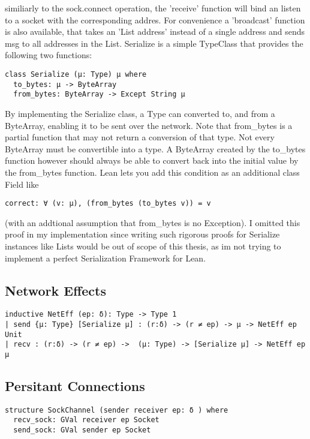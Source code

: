 similiarly to the sock.connect operation, the 'receive' function will bind an listen to a socket with the corresponding addres. For convenience a 'broadcast' function is also available, that takes an 'List address' instead of a single address and sends msg to all addresses in the List.
\newline
Serialize is a simple TypeClass that provides the following two functions:
\begin{lstlisting}[language=lean]
class Serialize (μ: Type) μ where
  to_bytes: μ -> ByteArray
  from_bytes: ByteArray -> Except String μ
\end{lstlisting}
By implementing the Serialize class, a Type can converted to, and from a ByteArray, enabling it to be sent over the network. Note that from_bytes is a partial function that may not return a conversion of that type. Not every ByteArray must be convertible into a type. A ByteArray created by the to_bytes function however should always be able to convert back into the initial value by the from_bytes function. Lean lets you add this condition as an additional class Field like
\begin{lstlisting}[language=lean]
 correct: ∀ (v: μ), (from_bytes (to_bytes v)) = v
\end{lstlisting}
(with an addtional assumption that from_bytes is no Exception). I omitted this proof in my implementation since writing such rigorous proofs for Serialize instances like Lists would be out of scope of this thesis, as im not trying to implement a perfect Serialization Framework for Lean.

\subsection{Network Effects}

\begin{lstlisting}[language=lean]
inductive NetEff (ep: δ): Type -> Type 1
| send {μ: Type} [Serialize μ] : (r:δ) -> (r ≠ ep) -> μ -> NetEff ep Unit
| recv : (r:δ) -> (r ≠ ep) ->  (μ: Type) -> [Serialize μ] -> NetEff ep μ
\end{lstlisting}
\subsection{Persitant Connections}

\begin{lstlisting}[language=lean]
structure SockChannel (sender receiver ep: δ ) where
  recv_sock: GVal receiver ep Socket
  send_sock: GVal sender ep Socket
\end{lstlisting}


